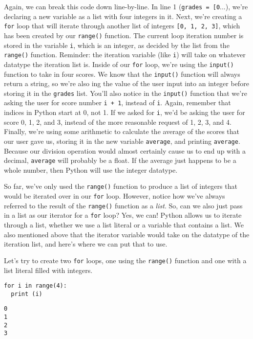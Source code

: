Again, we can break this code down line-by-line. In line 1 (\verb|grades = [0|...), we're declaring a new variable as a list with four integers in it. Next, we're creating a \verb|for| loop that will iterate through another list of integers \verb|[0, 1, 2, 3]|, which has been created by our \verb|range()| function. The current loop iteration number is stored in the variable \verb|i|, which is an integer, as decided by the list from the \verb|range()| function. Reminder: the iteration variable (like \verb|i|) will take on whatever datatype the iteration list is. Inside of our \verb|for| loop, we're using the \verb|input()| function to take in four scores. We know that the \verb|input()| function will always return a string, so we're also ing the value of the user input into an integer before storing it in the \verb|grades| list. You'll also notice in the \verb|input()| function that we're asking the user for score number \verb|i + 1|, instead of \verb|i|. Again, remember that indices in Python start at 0, not 1. If we asked for \verb|i|, we'd be asking the user for score 0, 1, 2, and 3, instead of the more reasonable request of 1, 2, 3, and 4. Finally, we're using some arithmetic to calculate the average of the scores that our user gave us, storing it in the new variable \verb|average|, and printing \verb|average|. Because our division operation would almost certainly cause us to end up with a decimal, \verb|average| will probably be a float. If the average just happens to be a whole number, then Python will use the integer datatype. \par
So far, we've only used the \verb|range()| function to produce a list of integers that would be iterated over in our \verb|for| loop. However, notice how we've always referred to the result of the \verb|range()| function as a \textit{list}. So, can we also just pass in a list as our iterator for a \verb|for| loop? Yes, we can! Python allows us to iterate through a list, whether we use a list literal or a variable that contains a list. We also mentioned above that the iterator variable would take on the datatype of the iteration list, and here's where we can put that to use.\par
Let's try to create two \verb|for| loops, one using the \verb|range()| function and one with a list literal filled with integers.\par
\begin{lstlisting}[style=pippython]
for i in range(4):
  print (i)
\end{lstlisting}
\begin{lstlisting}[style=none]
0
1
2
3
\end{lstlisting}

